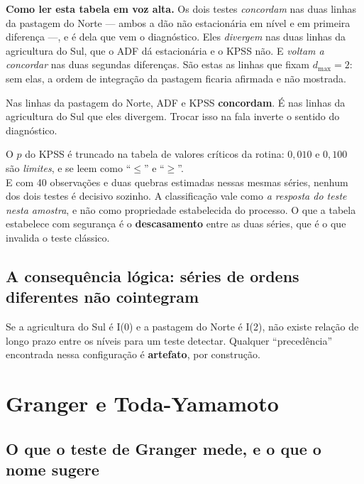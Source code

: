 \vspace{10pt}
\textbf{Como ler esta tabela em voz alta.} Os dois testes \emph{concordam} nas
duas linhas da pastagem do Norte --- ambos a dão não estacionária em nível e em
primeira diferença ---, e é dela que vem o diagnóstico. Eles \emph{divergem}
nas duas linhas da agricultura do Sul, que o ADF dá estacionária e o KPSS não.
E \emph{voltam a concordar} nas duas segundas diferenças. São estas as linhas
que fixam $d_{\max} = 2$: sem elas, a ordem de integração da pastagem ficaria
afirmada e não mostrada.

\begin{armadilha}
Nas linhas da pastagem do Norte, ADF e KPSS \textbf{concordam}. É nas linhas da
agricultura do Sul que eles divergem. Trocar isso na fala inverte o sentido do
diagnóstico.
\end{armadilha}

\begin{naodiz}
O $p$ do KPSS é truncado na tabela de valores críticos da rotina: $0{,}010$ e
$0{,}100$ são \emph{limites}, e se leem como ``$\leq$'' e ``$\geq$''. \\[4pt]
E com 40 observações e duas quebras estimadas nessas mesmas séries, nenhum dos
dois testes é decisivo sozinho. A classificação vale como \emph{a resposta do
teste nesta amostra}, e não como propriedade estabelecida do processo. O que a
tabela estabelece com segurança é o \textbf{descasamento} entre as duas séries,
que é o que invalida o teste clássico.
\end{naodiz}

\section{A consequência lógica: séries de ordens diferentes não cointegram}

Se a agricultura do Sul é I(0) e a pastagem do Norte é I(2), não existe relação
de longo prazo entre os níveis para um teste detectar. Qualquer ``precedência''
encontrada nessa configuração é \textbf{artefato}, por construção.

\chapter{Granger e Toda-Yamamoto}
\label{cap:granger}

\section{O que o teste de Granger mede, e o que o nome sugere}

